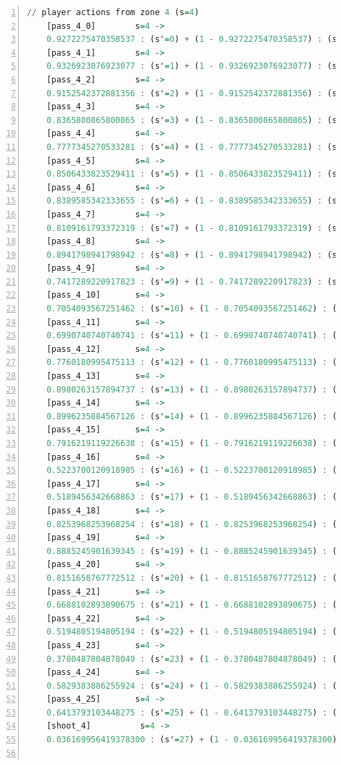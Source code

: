 \documentclass{l4proj}
\begin{document}
\begin{appendices}
\begin{lstlisting}[language=Haskell, numbers=left, caption=MDP used for strategy generation. This is the model specification as-is after the refinements at the end of chapter 3.]
	// player actions from zone 4 (s=4)
	[pass_4_0]	      s=4 ->
	0.9272275470358537 : (s'=0) + (1 - 0.9272275470358537) : (s'=26);
	[pass_4_1]	      s=4 ->
	0.9326923076923077 : (s'=1) + (1 - 0.9326923076923077) : (s'=26);
	[pass_4_2]	      s=4 ->
	0.9152542372881356 : (s'=2) + (1 - 0.9152542372881356) : (s'=26);
	[pass_4_3]	      s=4 ->
	0.8365800865800865 : (s'=3) + (1 - 0.8365800865800865) : (s'=26);
	[pass_4_4]	      s=4 ->
	0.7777345270533281 : (s'=4) + (1 - 0.7777345270533281) : (s'=26);
	[pass_4_5]	      s=4 ->
	0.8506433823529411 : (s'=5) + (1 - 0.8506433823529411) : (s'=26);
	[pass_4_6]	      s=4 ->
	0.8389585342333655 : (s'=6) + (1 - 0.8389585342333655) : (s'=26);
	[pass_4_7]	      s=4 ->
	0.8109161793372319 : (s'=7) + (1 - 0.8109161793372319) : (s'=26);
	[pass_4_8]	      s=4 ->
	0.8941798941798942 : (s'=8) + (1 - 0.8941798941798942) : (s'=26);
	[pass_4_9]	      s=4 ->
	0.7417289220917823 : (s'=9) + (1 - 0.7417289220917823) : (s'=26);
	[pass_4_10]	      s=4 ->
	0.7054093567251462 : (s'=10) + (1 - 0.7054093567251462) : (s'=26);
	[pass_4_11]	      s=4 ->
	0.6990740740740741 : (s'=11) + (1 - 0.6990740740740741) : (s'=26);
	[pass_4_12]	      s=4 ->
	0.7760180995475113 : (s'=12) + (1 - 0.7760180995475113) : (s'=26);
	[pass_4_13]	      s=4 ->
	0.8980263157894737 : (s'=13) + (1 - 0.8980263157894737) : (s'=26);
	[pass_4_14]	      s=4 ->
	0.8996235884567126 : (s'=14) + (1 - 0.8996235884567126) : (s'=26);
	[pass_4_15]	      s=4 ->
	0.7916219119226638 : (s'=15) + (1 - 0.7916219119226638) : (s'=26);
	[pass_4_16]	      s=4 ->
	0.5223700120918985 : (s'=16) + (1 - 0.5223700120918985) : (s'=26);
	[pass_4_17]	      s=4 ->
	0.5189456342668863 : (s'=17) + (1 - 0.5189456342668863) : (s'=26);
	[pass_4_18]	      s=4 ->
	0.8253968253968254 : (s'=18) + (1 - 0.8253968253968254) : (s'=26);
	[pass_4_19]	      s=4 ->
	0.8885245901639345 : (s'=19) + (1 - 0.8885245901639345) : (s'=26);
	[pass_4_20]	      s=4 ->
	0.8151658767772512 : (s'=20) + (1 - 0.8151658767772512) : (s'=26);
	[pass_4_21]	      s=4 ->
	0.6688102893890675 : (s'=21) + (1 - 0.6688102893890675) : (s'=26);
	[pass_4_22]	      s=4 ->
	0.5194805194805194 : (s'=22) + (1 - 0.5194805194805194) : (s'=26);
	[pass_4_23]	      s=4 ->
	0.3780487804878049 : (s'=23) + (1 - 0.3780487804878049) : (s'=26);
	[pass_4_24]	      s=4 ->
	0.5829383886255924 : (s'=24) + (1 - 0.5829383886255924) : (s'=26);
	[pass_4_25]	      s=4 ->
	0.6413793103448275 : (s'=25) + (1 - 0.6413793103448275) : (s'=26);
	[shoot_4]	       s=4 ->
	0.036169956419378300 : (s'=27) + (1 - 0.036169956419378300) : (s'=26);


\end{lstlisting}
\end{appendices}
\end{document}
